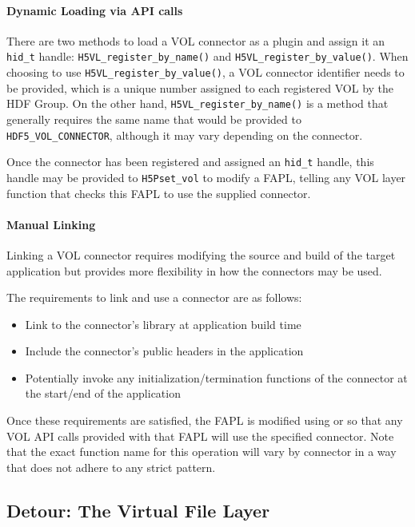 \paragraph{Dynamic Loading via API calls} There are two methods to load a VOL connector as a plugin and assign it an \texttt{hid\_t} handle: \texttt{H5VL\_register\_by\_name()} and \texttt{H5VL\_register\_by\_value()}. When choosing to use \texttt{H5VL\_register\_by\_value()}, a VOL connector identifier needs to be provided, which is a unique number assigned to each registered VOL by the HDF Group.  On the other hand, \texttt{H5VL\_register\_by\_name()} is a method that generally requires the same name that would be provided to \texttt{HDF5\_VOL\_CONNECTOR}, although it may vary depending on the connector.

Once the connector has been registered and assigned an \texttt{hid\_t} handle, this handle may be provided to \texttt{H5Pset\_vol} to modify a FAPL, telling any VOL layer function that checks this FAPL to use the supplied connector.

\paragraph{Manual Linking} Linking a VOL connector requires modifying the source and build of the target application but provides more flexibility in how the connectors may be used.

The requirements to link and use a connector are as follows:
\begin{itemize}
    \item Link to the connector's library at application build time
    \item Include the connector's public headers in the application
    \item Potentially invoke any initialization/termination functions of the connector at the start/end of the application
\end{itemize}

Once these requirements are satisfied, the FAPL is modified using   or  so that any VOL API calls provided with that FAPL will use the specified connector. Note that the exact function name for this operation will vary by connector in a way that does not adhere to any strict pattern.

\subsection{Detour: The Virtual File Layer}\label{sec:vfl}

